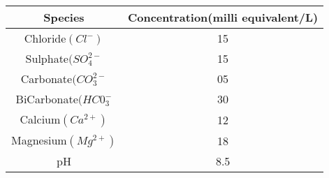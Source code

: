 \begin{tabular}{c|c}
    \hline
    \textbf{Species} & \textbf{Concentration(milli equivalent/L)}\\
    \hline
    Chloride$(Cl^{-})$ & 15\\
    Sulphate$(SO_{4}^{2-}$ & 15 \\
    Carbonate$(CO_{3}^{2-}$ & 05 \\
    BiCarbonate$(HC0_{3}^{-}$ & 30 \\
    Calcium$(Ca^{2+})$ & 12 \\
    Magnesium$(Mg^{2+})$ & 18 \\ 
    pH & 8.5 \\
    \hline
    \end{tabular}
